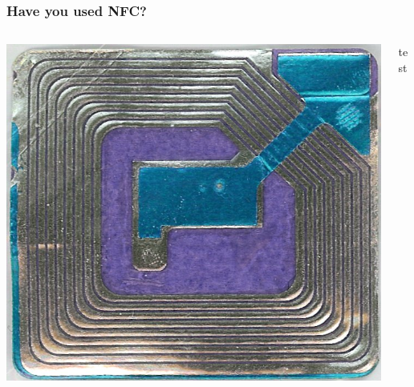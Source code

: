 \documentclass[unknownkeysallowed]{beamer}
\begin{document}
{%
  \begin{frame}
  \frametitle{Have you used NFC?}
    \begin{columns}[T]
      \begin{column}{.5\textwidth}
    		\begin{block}{}
    		  \begin{center}
      		\includegraphics[scale=.5]{figures/wikimediatag.jpg}
      		\end{center}
      	\end{block}
      \end{column}
      \begin{column}{.5\textwidth}
          test
      \end{column}
    \end{columns}
  \end{frame}
}
\end{document}
